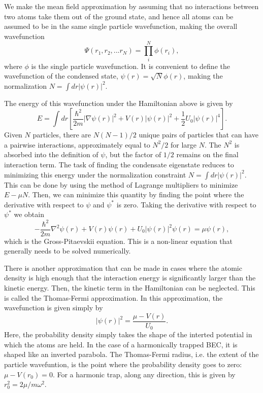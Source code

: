 We make the mean field approximation by assuming that no interactions between two atoms take them out of the ground state, and hence all atoms can be assumed to be in the same single particle wavefunction, making the overall wavefunction
\begin{equation}
\Psi(r_1,r_2,...r_N)=\prod_i^N \phi(r_i),
\end{equation}
where $\phi$ is the single particle wavefunction. It is convenient to define the wavefunction of the condensed state, $\psi(r) = \sqrt{N}\phi(r)$, making the normalization $N=\int dr |\psi(r)|^2$.

The energy of this wavefunction under the Hamiltonian above is given by
\begin{equation}
E=\int dr\left[ \frac{\hbar^2}{2m}|\nabla\psi(r)|^2 + V(r)|\psi(r)|^2 + \frac{1}{2}U_0|\psi(r)|^4\right].
\end{equation}
Given $N$ particles, there are $N(N-1)/2$ unique pairs of particles that can have a pairwise interactions, approximately equal to $N^2/2$ for large $N$. The $N^2$ is absorbed into the definition of $\psi$, but the factor of $1/2$ remains on the final interaction term. The task of finding the condensate eigenstate reduces to minimizing this energy under the normalization constraint $N=\int dr |\psi(r)|^2$. This can be done by using the method of Lagrange multipliers to minimize $E-\mu N$. Then, we can minimize this quantity by finding the point where the derivative with respect to $\psi$ and $\psi^*$ is zero. Taking the derivative with respect to $\psi^*$ we obtain 
\begin{equation}
-\frac{\hbar^2}{2m} \nabla^2 \psi(r) + V(r)\psi(r) + U_0 |\psi(r)|^2\psi(r) = \mu \psi(r),
\end{equation}
which is the Gross-Pitaevskii equation. This is a non-linear equation that generally needs to be solved numerically.

There is another approximation that can be made in cases where the atomic density is high enough that the interaction energy is significantly larger than the kinetic energy. Then, the kinetic term in the Hamiltonian can be neglected. This is called the Thomas-Fermi approximation. In this approximation, the wavefunction is given simply by
\begin{equation}
|\psi(r)|^2 = \frac{\mu - V(r)}{U_0}.
\end{equation}
Here, the probability density simply takes the shape of the interted potential in which the atoms are held. In the case of a harmonically trapped BEC, it is shaped like an inverted parabola. The Thomas-Fermi radius, i.e. the extent of the particle wavefuntion, is the point where the probability density goes to zero: $\mu - V(r_0) = 0$. For a harmonic trap, along any direction, this is given by $r_0^2 = 2\mu/m\omega^2$. 

